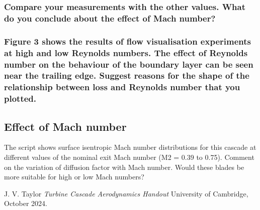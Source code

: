\documentclass{article}
\begin{document}
\subsubsection{Compare your measurements with the other values. What do you conclude about the
effect of Mach number?}


\subsubsection{Figure 3 shows the results of flow visualisation experiments at high and low Reynolds
numbers. The effect of Reynolds number on the behaviour of the boundary layer can be seen
near the trailing edge. Suggest reasons for the shape of the relationship between loss and
Reynolds number that you plotted.}



\subsection{Effect of Mach number}
The script shows surface isentropic Mach number distributions for this cascade at different
values of the nominal exit Mach number (M2 = 0.39 to 0.75). Comment on the variation of
diffusion factor with Mach number. Would these blades be more suitable for high or low Mach
numbers?


\begin{thebibliography}{9}


  J. V. Taylor
  \emph{Turbine Cascade Aerodynamics Handout}
  University of Cambridge,
  October 2024.

\end{thebibliography}
\end{document}
